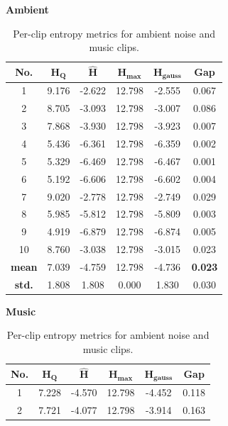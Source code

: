 \documentclass[a4paper,10pt]{article}
\theoremstyle{nonumberplain}
\theoremstyle{nonumberplain}
\theoremstyle{nonumberplain}
\theoremstyle{nonumberplain}
\begin{document}
\begin{table}[H]
    \centering
    \caption{Per-clip entropy metrics for ambient noise and music clips.}
    \label{tab:q3_per_clip}
    {\normalsize
    \setlength{\tabcolsep}{4pt}
    \begin{minipage}[t]{0.48\textwidth}
        \centering
        \textbf{Ambient}\\
        \vspace{0.1cm}
        \begin{tabular}{c c c c c c}
    \hline
    \textbf{No.} & $\mathbf{H_Q}$ & $\mathbf{\hat{H}}$ & $\mathbf{H_{max}}$ & $\mathbf{H_{gauss}}$ & \textbf{Gap} \\
    \hline
    1 & 9.176 & -2.622 & 12.798 & -2.555 & 0.067 \\
    2 & 8.705 & -3.093 & 12.798 & -3.007 & 0.086 \\
    3 & 7.868 & -3.930 & 12.798 & -3.923 & 0.007 \\
    4 & 5.436 & -6.361 & 12.798 & -6.359 & 0.002 \\
    5 & 5.329 & -6.469 & 12.798 & -6.467 & 0.001 \\
    6 & 5.192 & -6.606 & 12.798 & -6.602 & 0.004 \\
    7 & 9.020 & -2.778 & 12.798 & -2.749 & 0.029 \\
    8 & 5.985 & -5.812 & 12.798 & -5.809 & 0.003 \\
    9 & 4.919 & -6.879 & 12.798 & -6.874 & 0.005 \\
    10 & 8.760 & -3.038 & 12.798 & -3.015 & 0.023 \\
    \hline
    \textbf{mean} & 7.039 & -4.759 & 12.798 & -4.736 & \textbf{0.023} \\
    \textbf{std.} & 1.808 & 1.808 & 0.000 & 1.830 & 0.030 \\
    \hline
    \end{tabular}
    \end{minipage}\hfill
    \begin{minipage}[t]{0.48\textwidth}
        \centering
        \textbf{Music}\\
        \vspace{0.1cm}
        \begin{tabular}{c c c c c c}
            \hline
            \textbf{No.} & $\mathbf{H_Q}$ & $\mathbf{\hat{H}}$ & $\mathbf{H_{max}}$ & $\mathbf{H_{gauss}}$ & \textbf{Gap} \\
            \hline
            1 & 7.228 & -4.570 & 12.798 & -4.452 & 0.118 \\
            2 & 7.721 & -4.077 & 12.798 & -3.914 & 0.163 \\

\end{tabular}
\end{minipage}}
\end{table}
\end{document}
